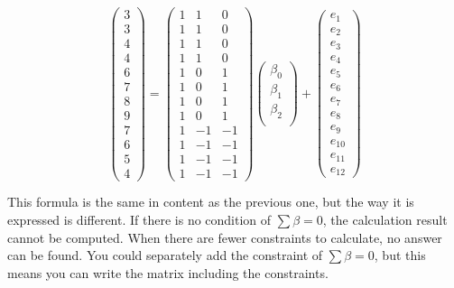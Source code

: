 \documentclass{ltjsbook}
\begin{document}
\[
	\begin{pmatrix}
		3 \\
		3 \\
		4 \\
		4 \\
		6 \\
		7 \\
		8 \\
		9 \\
		7 \\
		6 \\
		5 \\
		4
	\end{pmatrix}
	=
	\begin{pmatrix}
		1 & 1  & 0  \\
		1 & 1  & 0  \\
		1 & 1  & 0  \\
		1 & 1  & 0  \\
		1 & 0  & 1  \\
		1 & 0  & 1  \\
		1 & 0  & 1  \\
		1 & 0  & 1  \\
		1 & -1 & -1 \\
		1 & -1 & -1 \\
		1 & -1 & -1 \\
		1 & -1 & -1
	\end{pmatrix}
	\begin{pmatrix}
		\beta_0 \\
		\beta_1 \\
		\beta_2 \\
	\end{pmatrix}+
	\begin{pmatrix}
		e_1    \\
		e_2    \\
		e_3    \\
		e_4    \\
		e_5    \\
		e_6    \\
		e_7    \\
		e_8    \\
		e_9    \\
		e_{10} \\
		e_{11} \\
		e_{12}
	\end{pmatrix}
\]

This formula is the same in content as the previous one, but the way it is expressed is different. If there is no condition of $\sum \beta= 0$, the calculation result cannot be computed. When there are fewer constraints to calculate, no answer can be found. You could separately add the constraint of $\sum \beta= 0$, but this means you can write the matrix including the constraints.
\end{document}
